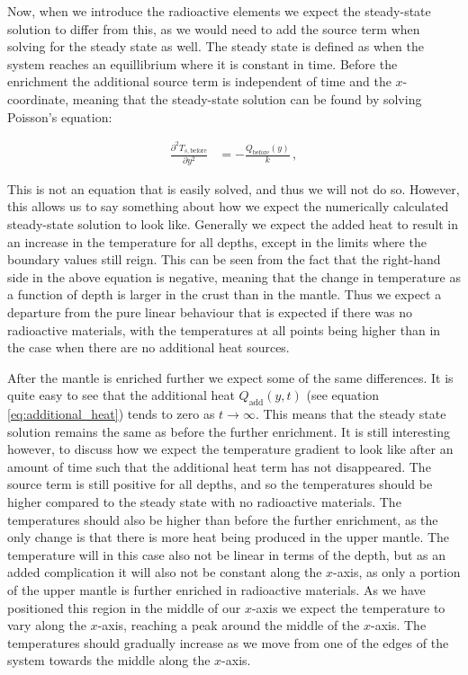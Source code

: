 \documentclass[reprint,english,notitlepage]{revtex4-1}  %
\begin{document}
Now, when we introduce the radioactive elements we expect the steady-state solution to differ from this, as we would need to add the source term when solving for the steady state as well. The steady state is defined as when the system reaches an equillibrium where it is constant in time. Before the enrichment the additional source term is independent of time and the $x$-coordinate, meaning that the steady-state solution can be found by solving Poisson's equation:

\begin{align*}
\frac{\partial^2 T_{s,\text{before}}}{\partial y^2} &= -\frac{Q_{\text{before}}(y)}{k} \, , 
\end{align*} 

This is not an equation that is easily solved, and thus we will not do so. However, this allows us to say something about how we expect the numerically calculated steady-state solution to look like. Generally we expect the added heat to result in an increase in the temperature for all depths, except in the limits where the boundary values still reign. This can be seen from the fact that the right-hand side in the above equation is negative, meaning that the change in temperature as a function of depth is larger in the crust than in the mantle. Thus we expect a departure from the pure linear behaviour that is expected if there was no radioactive materials, with the temperatures at all points being higher than in the case when there are no additional heat sources.

After the mantle is enriched further we expect some of the same differences. It is quite easy to see that the additional heat $Q_{\text{add}}(y,t)$ (see equation \eqref{eq:additional_heat}) tends to zero as $t\to \infty$. This means that the steady state solution remains the same as before the further enrichment. It is still interesting however, to discuss how we expect the temperature gradient to look like after an amount of time such that the additional heat term has not disappeared. The source term is still positive for all depths, and so the temperatures should be higher compared to the steady state with no radioactive materials. The temperatures should also be higher than before the further enrichment, as the only change is that there is more heat being produced in the upper mantle. The temperature will in this case also not be linear in terms of the depth, but as an added complication it will also not be constant along the $x$-axis, as only a portion of the upper mantle is further enriched in radioactive materials. As we have positioned this region in the middle of our $x$-axis we expect the temperature to vary along the $x$-axis, reaching a peak around the middle of the $x$-axis. The temperatures should gradually increase as we move from one of the edges of the system towards the middle along the $x$-axis. 
\end{document}
